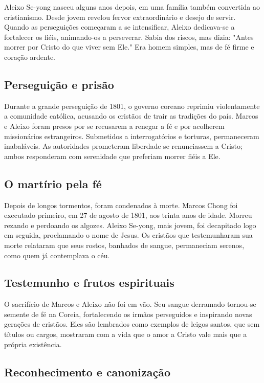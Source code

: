 \documentclass[a4paper,14pt]{extarticle} \usepackage[utf8]{inputenc}
\begin{document}
 Aleixo Se-yong nasceu alguns anos depois, em uma família também convertida ao cristianismo. Desde jovem revelou fervor extraordinário e desejo de servir. Quando as perseguições começaram a se intensificar, Aleixo dedicava-se a fortalecer os fiéis, animando-os a perseverar. Sabia dos riscos, mas dizia: "Antes morrer por Cristo do que viver sem Ele." Era homem simples, mas de fé firme e coração ardente.

 \subsection{Perseguição e prisão}

 Durante a grande perseguição de 1801, o governo coreano reprimiu violentamente a comunidade católica, acusando os cristãos de trair as tradições do país. Marcos e Aleixo foram presos por se recusarem a renegar a fé e por acolherem missionários estrangeiros. Submetidos a interrogatórios e torturas, permaneceram inabaláveis. As autoridades prometeram liberdade se renunciassem a Cristo; ambos responderam com serenidade que preferiam morrer fiéis a Ele.

 \subsection{O martírio pela fé}

 Depois de longos tormentos, foram condenados à morte. Marcos Chong foi executado primeiro, em 27 de agosto de 1801, aos trinta anos de idade. Morreu rezando e perdoando os algozes. Aleixo Se-yong, mais jovem, foi decapitado logo em seguida, proclamando o nome de Jesus. Os cristãos que testemunharam sua morte relataram que seus rostos, banhados de sangue, permaneciam serenos, como quem já contemplava o céu.

 \subsection{Testemunho e frutos espirituais}

 O sacrifício de Marcos e Aleixo não foi em vão. Seu sangue derramado tornou-se semente de fé na Coreia, fortalecendo os irmãos perseguidos e inspirando novas gerações de cristãos. Eles são lembrados como exemplos de leigos santos, que sem títulos ou cargos, mostraram com a vida que o amor a Cristo vale mais que a própria existência.

 \subsection{Reconhecimento e canonização}
\end{document}
